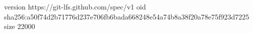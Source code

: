 version https://git-lfs.github.com/spec/v1
oid sha256:a50f74d2b71776d237e706fb6bada668248e54a74b8a38f20a78e75f923d7225
size 22000
